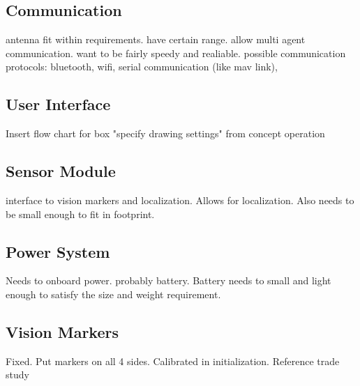 \subsection{Communication}
antenna fit within requirements. have certain range. allow multi agent communication. want to be fairly speedy and realiable. possible communication protocols: bluetooth, wifi, serial communication (like mav link),  

\subsection{User Interface}
Insert flow chart for box "specify drawing settings" from concept operation

\subsection{Sensor Module}
interface to vision markers and localization. Allows for localization. Also needs to be small enough to fit in footprint. 

\subsection{Power System}
Needs to onboard power. probably battery. Battery needs to small and light enough to satisfy the size and weight requirement. 

\subsection{Vision Markers}
Fixed. Put markers on all 4 sides. Calibrated in initialization. Reference trade study